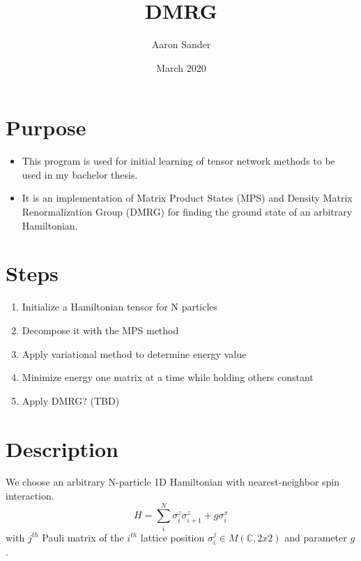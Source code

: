 \documentclass[a4paper,12pt]{article}
\begin{document}
\title{DMRG}
\author{Aaron Sander}
\date{March 2020}
\maketitle


\section{Purpose}
\begin{itemize}
\item This program is used for initial learning of tensor network methods to be used in my bachelor thesis.
\item It is an implementation of Matrix Product States (MPS) and Density Matrix Renormalization Group (DMRG)
  for finding the ground state of an arbitrary Hamiltonian.
\end{itemize}

\section{Steps}
\begin{enumerate}
\item Initialize a Hamiltonian tensor for N particles
\item Decompose it with the MPS method
\item Apply variational method to determine energy value
\item Minimize energy one matrix at a time while holding others constant
\item Apply DMRG? (TBD)
\end{enumerate}

\section{Description}
We choose an arbitrary N-particle 1D Hamiltonian with nearest-neighbor spin interaction.
\[H = \sum_i^N{\sigma^z_i \sigma^z_{i+1} + g \sigma^x_i}\]
with $j^{th}$ Pauli matrix of the $i^{th}$ lattice position $\sigma^j_i \in M(\mathbb{C}, 2x2)$ and parameter $g$.
\end{document}
